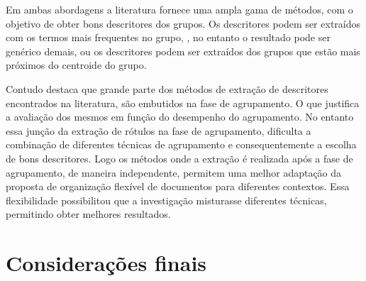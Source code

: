 Em ambas abordagens a literatura fornece uma ampla gama de métodos, com o objetivo de obter bons
descritores dos grupos. Os descritores podem ser extraídos com os termos mais frequentes no grupo, ,
no entanto o resultado pode ser genérico demais\cite{Pucktada2006}, ou os descritores podem ser
extraídos dos grupos que estão mais próximos do centroide do grupo.

Contudo \cite{Nogueira2013} destaca que grande parte dos métodos de extração de descritores
encontrados na literatura, são embutidos na fase de agrupamento. O que justifica a avaliação dos
mesmos em função do desempenho do agrupamento. No entanto essa junção da extração de rótulos na fase
de agrupamento, dificulta a combinação de diferentes técnicas de agrupamento e consequentemente a
escolha de bons descritores. Logo os métodos onde a extração é realizada após a fase de agrupamento,
de maneira independente, permitem uma melhor adaptação da proposta de organização flexível de
documentos para diferentes contextos. Essa flexibilidade possibilitou que a investigação misturasse
diferentes técnicas, permitindo obter melhores resultados.

\section{Considerações finais}




